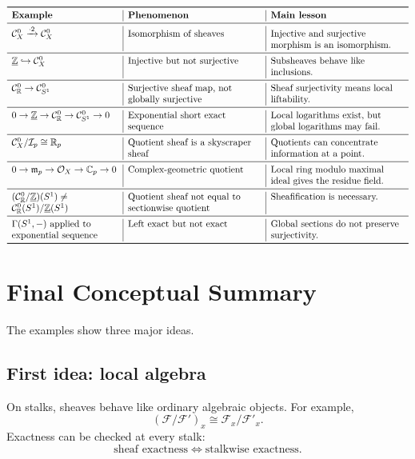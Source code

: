 \documentclass[12pt,a4paper]{article}
\newcommand{\F}{\mathcal F}
\newcommand{\RR}{\mathbb{R}}
\newcommand{\ZZ}{\mathbb{Z}}
\newcommand{\Czero}{\mathcal C^0}        %
\newcommand{\CC}{\mathbb{C}}
\newcommand{\OO}{\mathcal{O}}
\theoremstyle{notespace}
\newcommand{\Fp}{\mathcal F'}      %
\newcommand{\SSone}{S^1}
\begin{document}
\[
\begin{array}{>{\raggedright\arraybackslash}p{4cm}
		|>{\raggedright\arraybackslash}p{5cm}
		|>{\raggedright\arraybackslash}p{5cm}}
	\toprule
	\textbf{Example} & \textbf{Phenomenon} & \textbf{Main lesson} \\
	\midrule
	\(\Czero_X\xrightarrow{\cdot 2}\Czero_X\)
	&
	Isomorphism of sheaves
	&
	Injective and surjective morphism is an isomorphism.
	\\
	\midrule
	\(\underline{\ZZ}\hookrightarrow \Czero_X\)
	&
	Injective but not surjective
	&
	Subsheaves behave like inclusions.
	\\
	\midrule
	\(\Czero_{\RR}\to \Czero_{\SSone}\)
	&
	Surjective sheaf map, not globally surjective
	&
	Sheaf surjectivity means local liftability.
	\\
	\midrule
	\(0\to \underline{\ZZ}\to \Czero_{\RR}\to \Czero_{\SSone}\to 0\)
	&
	Exponential short exact sequence
	&
	Local logarithms exist, but global logarithms may fail.
	\\
	\midrule
	\(\Czero_X/\mathcal I_p\cong \RR_p\)
	&
	Quotient sheaf is a skyscraper sheaf
	&
	Quotients can concentrate information at a point.
	\\
	\midrule
	\(0\to \mathfrak m_p\to \OO_X\to \CC_p\to 0\)
	&
	Complex-geometric quotient
	&
	Local ring modulo maximal ideal gives the residue field.
	\\
	\midrule
	\((\Czero_{\RR}/\underline{\ZZ})(\SSone)
	\neq
	\Czero_{\RR}(\SSone)/\underline{\ZZ}(\SSone)\)
	&
	Quotient sheaf not equal to sectionwise quotient
	&
	Sheafification is necessary.
	\\
	\midrule
	\(\Gamma(\SSone,-)\) applied to exponential sequence
	&
	Left exact but not exact
	&
	Global sections do not preserve surjectivity.
	\\
	\bottomrule
\end{array}
\]


\section{Final Conceptual Summary}

The examples show three major ideas.

\subsection{First idea: local algebra}

On stalks, sheaves behave like ordinary algebraic objects. For example,
\[
(\F/\Fp)_x\cong \F_x/\Fp_x.
\]
Exactness can be checked at every stalk:
\[
\text{sheaf exactness}
\Longleftrightarrow
\text{stalkwise exactness}.
\]
\end{document}
